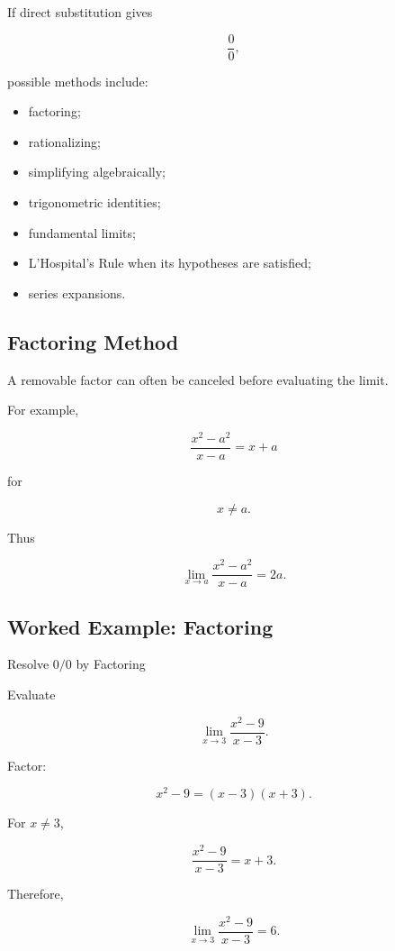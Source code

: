 If direct substitution gives

\[
\frac00,
\]

possible methods include:

\begin{itemize}
    \item factoring;
    \item rationalizing;
    \item simplifying algebraically;
    \item trigonometric identities;
    \item fundamental limits;
    \item L'Hospital's Rule when its hypotheses are satisfied;
    \item series expansions.
\end{itemize}

\subsection{Factoring Method}
\label{subsec:factoring-limit-method}

A removable factor can often be canceled before evaluating the limit.

For example,

\[
\frac{x^2-a^2}{x-a}
=
x+a
\]

for

\[
x\neq a.
\]

Thus

\[
\boxed{
\lim_{x\to a}
\frac{x^2-a^2}{x-a}
=
2a.
}
\]

\subsection{Worked Example: Factoring}
\label{subsec:worked-factoring-limit}

\begin{workedexamplebox}{Resolve \(0/0\) by Factoring}

Evaluate

\[
\lim_{x\to3}
\frac{x^2-9}{x-3}.
\]

Factor:

\[
x^2-9
=
(x-3)(x+3).
\]

For \(x\neq3\),

\[
\frac{x^2-9}{x-3}
=
x+3.
\]

Therefore,

\begin{answerbox}
\[
\boxed{
\lim_{x\to3}
\frac{x^2-9}{x-3}
=
6.
}
\]
\end{answerbox}

\end{workedexamplebox}

